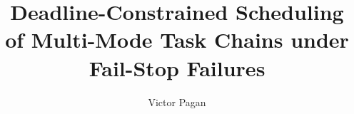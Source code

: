 \documentclass[11pt]{uhthesis}
\title{Deadline-Constrained Scheduling of Multi-Mode Task Chains under Fail-Stop Failures}
\author{Victor Pagan}
\begin{document}
\maketitle

\begin{frontmatter}


\begin{abstract}

\end{abstract}

\tableofcontents

\listoftables

\listoffigures

\end{frontmatter}





















\end{document}
